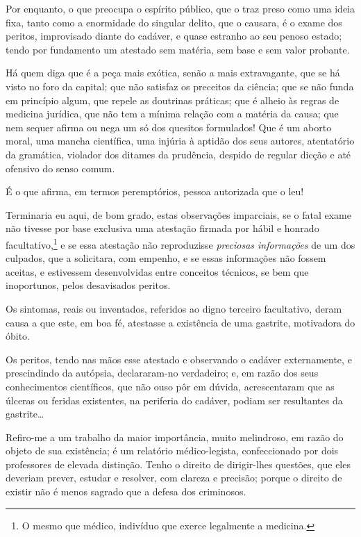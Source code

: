 Por enquanto, o que preocupa o espírito público, que o traz preso como
uma ideia fixa, tanto como a enormidade do singular delito, que o
causara, é o exame dos peritos, improvisado diante do cadáver, e quase
estranho ao seu penoso estado; tendo por fundamento um atestado sem
matéria, sem base e sem valor probante.

Há quem diga que é a peça mais exótica, senão a mais extravagante, que
se há visto no foro da capital; que não satisfaz os preceitos da
ciência; que se não funda em princípio algum, que repele as doutrinas
práticas; que é alheio às regras de medicina jurídica, que não tem a
mínima relação com a matéria da causa; que nem sequer afirma ou nega um
só dos quesitos formulados! Que é um aborto moral, uma mancha
científica, uma injúria à aptidão dos seus autores, atentatório da
gramática, violador dos ditames da prudência, despido de regular dicção
e até ofensivo do senso comum.

É o que afirma, em termos peremptórios, pessoa autorizada que o leu!

Terminaria eu aqui, de bom grado, estas observações imparciais, se o
fatal exame não tivesse por base exclusiva uma atestação firmada por
hábil e honrado facultativo,\footnote{O mesmo que médico, indivíduo que
  exerce legalmente a medicina.} e se essa atestação não reproduzisse
\emph{preciosas informações} de um dos culpados, que a solicitara, com
empenho, e se essas informações não fossem aceitas, e estivessem
desenvolvidas entre conceitos técnicos, se bem que inoportunos, pelos
desavisados peritos.

Os sintomas, reais ou inventados, referidos ao digno terceiro
facultativo, deram causa a que este, em boa fé, atestasse a existência
de uma gastrite, motivadora do óbito.

Os peritos, tendo nas mãos esse atestado e observando o cadáver
externamente, e prescindindo da autópsia, declararam-no verdadeiro; e,
em razão dos seus conhecimentos científicos, que não ouso pôr em dúvida,
acrescentaram que as úlceras ou feridas existentes, na periferia do
cadáver, podiam ser resultantes da gastrite\ldots{}

Refiro-me a um trabalho da maior importância, muito melindroso, em razão
do objeto de sua existência; é um relatório médico-legista,
confeccionado por dois professores de elevada distinção. Tenho o direito
de dirigir-lhes questões, que eles deveriam prever, estudar e resolver,
com clareza e precisão; porque o direito de existir não é menos sagrado
que a defesa dos criminosos.

